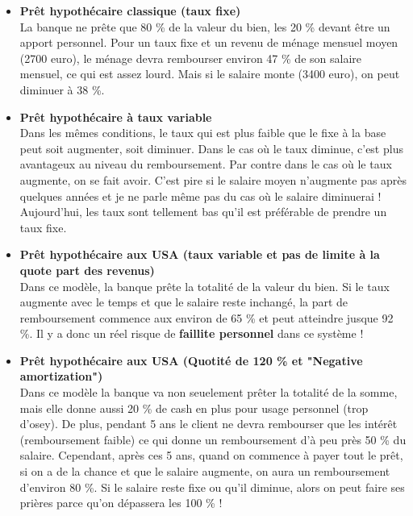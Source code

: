 \begin{itemize}
	\item \textbf{Prêt hypothécaire classique (taux fixe)}\\
	      La banque ne prête que 80 \% de la valeur du bien, les 20 \% devant être un apport personnel. Pour un taux fixe et un revenu de ménage mensuel moyen (2700 euro), le ménage devra rembourser environ 47 \% de son salaire mensuel, ce qui est assez lourd. Mais si le salaire monte (3400 euro), on peut diminuer à 38 \%. 
	      
	\item \textbf{Prêt hypothécaire à taux variable}\\
	      Dans les mêmes conditions, le taux qui est plus faible que le fixe à la base peut soit augmenter, soit diminuer. Dans le cas où le taux diminue, c'est plus avantageux au niveau du remboursement. Par contre dans le cas où le taux augmente, on se fait avoir. C'est pire si le salaire moyen n'augmente pas après quelques années et je ne parle même pas du cas où le salaire diminuerai ! Aujourd'hui, les taux sont tellement bas qu'il est préférable de prendre un taux fixe.
	      
	\item \textbf{Prêt hypothécaire aux USA (taux variable et pas de limite à la quote part des revenus)}\\
	      Dans ce modèle, la banque prête la totalité de la valeur du bien. Si le taux augmente avec le temps et que le salaire reste inchangé, la part de remboursement commence aux environ de 65 \% et peut atteindre jusque 92 \%. Il y a donc un réel risque de \textbf{faillite personnel} dans ce système !
	      
	\item \textbf{Prêt hypothécaire aux USA (Quotité de 120 \% et "Negative amortization")}\\
	      Dans ce modèle la banque va non seuelement prêter la totalité de la somme, mais elle donne aussi 20 \% de cash en plus pour usage personnel (trop d'osey). De plus, pendant 5 ans le client ne devra rembourser que les intérêt (remboursement faible) ce qui donne un remboursement d'à peu près 50 \% du salaire. Cependant, après ces 5 ans, quand on commence à payer tout le prêt, si on a de la chance et que le salaire augmente, on aura un remboursement d'environ 80 \%. Si le salaire reste fixe ou qu'il diminue, alors on peut faire ses prières parce qu'on dépassera les 100 \% !
\end{itemize}


